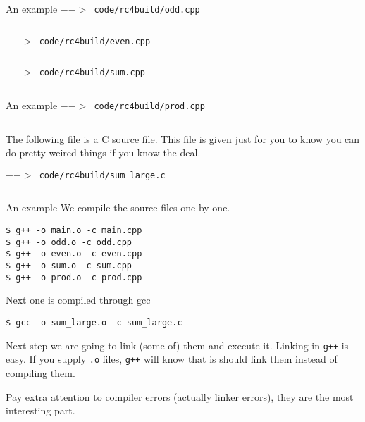 \begin{frame}[fragile]{An example}
\label{example:dec_def}
\vspace{0.04in}
\texttt{$-->$ code/rc4build/odd.cpp}
\inputminted{c++}{code/rc4build/odd.cpp}

\vspace{0.04in}
\texttt{$-->$ code/rc4build/even.cpp}
\inputminted{c++}{code/rc4build/even.cpp}

\vspace{0.04in}
\texttt{$-->$ code/rc4build/sum.cpp}
\inputminted{c++}{code/rc4build/sum.cpp}
\end{frame}

\begin{frame}[fragile]{An example}
\texttt{$-->$ code/rc4build/prod.cpp}
\inputminted{c++}{code/rc4build/prod.cpp}

\vspace{0.04in}
\begin{small}
	The following file is a C source file. This file is given just for you to know you can do pretty weired things if you know the deal.
\end{small}

\texttt{$-->$ code/rc4build/sum\_large.c}
\inputminted{c++}{code/rc4build/sum_large.c}

\end{frame}

\begin{frame}[fragile]{An example}
We compile the source files one by one. 
\begin{verbatim}
$ g++ -o main.o -c main.cpp
$ g++ -o odd.o -c odd.cpp
$ g++ -o even.o -c even.cpp
$ g++ -o sum.o -c sum.cpp
$ g++ -o prod.o -c prod.cpp
\end{verbatim}
Next one is compiled through gcc
\begin{verbatim}
$ gcc -o sum_large.o -c sum_large.c
\end{verbatim}

Next step we are going to link (some of) them and execute it. Linking in \texttt{g++} is easy. If you supply \texttt{.o} files, \texttt{g++} will know that is should link them instead of compiling them.

Pay extra attention to compiler errors (actually linker errors), they are the most interesting part.

\end{frame}

